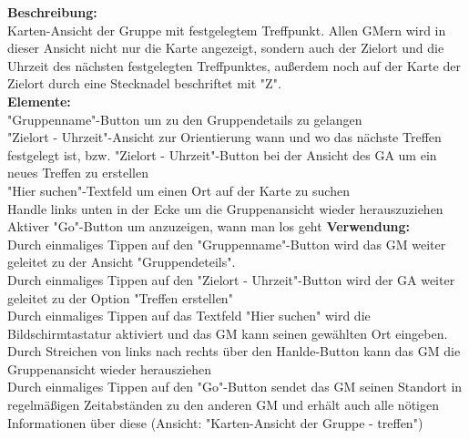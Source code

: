 \textbf{Beschreibung:}\\
Karten-Ansicht der Gruppe mit festgelegtem Treffpunkt. Allen GMern wird in dieser Ansicht nicht nur die Karte angezeigt, sondern auch der Zielort und die Uhrzeit des nächsten festgelegten Treffpunktes, außerdem noch auf der Karte der Zielort durch eine Stecknadel beschriftet mit "Z".\\
\textbf{Elemente:}\\
"Gruppenname"-Button um zu den Gruppendetails zu gelangen\\
"Zielort - Uhrzeit"-Ansicht zur Orientierung wann und wo das nächste Treffen festgelegt ist, bzw. "Zielort - Uhrzeit"-Button bei der Ansicht des GA um ein neues Treffen zu erstellen\\
"Hier suchen"-Textfeld um einen Ort auf der Karte zu suchen\\
Handle links unten in der Ecke um die Gruppenansicht wieder herauszuziehen\\
Aktiver "Go"-Button um anzuzeigen, wann man los geht
\textbf{Verwendung:}\\
Durch einmaliges Tippen auf den "Gruppenname"-Button wird das GM weiter geleitet zu der Ansicht "Gruppendeteils".\\
Durch einmaliges Tippen auf den "Zielort - Uhrzeit"-Button wird der GA weiter geleitet zu der Option "Treffen erstellen"\\
Durch einmaliges Tippen auf das Textfeld "Hier suchen" wird die Bildschirmtastatur aktiviert und das GM kann seinen gewählten Ort eingeben.\\
Durch Streichen von links nach rechts über den Hanlde-Button kann das GM die Gruppenansicht wieder herausziehen\\
Durch einmaliges Tippen auf den "Go"-Button sendet das GM seinen Standort in regelmäßigen Zeitabständen zu den anderen GM und erhält auch alle nötigen Informationen über diese (Ansicht: "Karten-Ansicht der Gruppe - treffen")
\newpage

